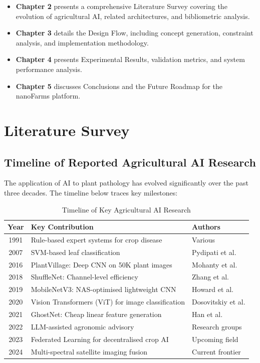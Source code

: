 \documentclass[12pt,oneside]{report}
\begin{document}
\begin{itemize}
    \item \textbf{Chapter 2} presents a comprehensive Literature Survey covering the evolution of agricultural AI, related architectures, and bibliometric analysis.
    \item \textbf{Chapter 3} details the Design Flow, including concept generation, constraint analysis, and implementation methodology.
    \item \textbf{Chapter 4} presents Experimental Results, validation metrics, and system performance analysis.
    \item \textbf{Chapter 5} discusses Conclusions and the Future Roadmap for the nanoFarms platform.
\end{itemize}

\chapter{Literature Survey}

\section{Timeline of Reported Agricultural AI Research}
The application of AI to plant pathology has evolved significantly over the past three decades. The timeline below traces key milestones:

\begin{table}[H]
\centering
\caption{Timeline of Key Agricultural AI Research}
\begin{tabular}{@{}cll@{}}
\toprule
\textbf{Year} & \textbf{Key Contribution} & \textbf{Authors} \\ \midrule
1991 & Rule-based expert systems for crop disease & Various \\
2007 & SVM-based leaf classification & Pydipati et al. \\
2016 & PlantVillage: Deep CNN on 50K plant images & Mohanty et al. \\
2018 & ShuffleNet: Channel-level efficiency & Zhang et al. \\
2019 & MobileNetV3: NAS-optimised lightweight CNN & Howard et al. \\
2020 & Vision Transformers (ViT) for image classification & Dosovitskiy et al. \\
2021 & GhostNet: Cheap linear feature generation & Han et al. \\
2022 & LLM-assisted agronomic advisory & Research groups \\
2023 & Federated Learning for decentralised crop AI & Upcoming field \\
2024 & Multi-spectral satellite imaging fusion & Current frontier \\ \bottomrule
\end{tabular}
\end{table}
\end{document}
